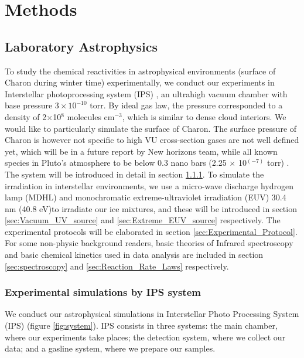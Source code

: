 \chapter{\protect Methods}
\label{methods}

\section{Laboratory Astrophysics}
To study the chemical reactivities in astrophysical environments (surface of Charon during winter time) experimentally,
we conduct our experiments in Interstellar photoprocessing system (IPS) \cite{chen2013vacuum},
an ultrahigh vacuum chamber with base pressure $3 \times 10^{-10}$ torr. By ideal gas law, the pressure corresponded to a density of 2$\times$10$^8$ molecules cm$^{-3}$, which is similar to dense cloud interiors. We would like to particularly simulate the surface of Charon. The surface pressure of Charon is however not specific to high VU cross-section gases are not well defined yet, which will be in a future report by New horizons team, while all known species in Pluto's atmosphere to be below 0.3 nano bars (2.25 $\times$ 10$^(-7)$ torr) \cite{stern2017new}.
The system will be introduced in detail in section \ref{sec:IPS_system}.
To simulate the irradiation in interstellar environments,
we use a micro-wave discharge hydrogen lamp (MDHL) and monochromatic extreme-ultraviolet irradiation (EUV) 30.4 nm (40.8 eV)to irradiate our ice mixtures,
and these will be introduced in section \ref{sec:Vacuum_UV_source} and \ref{sec:Extreme_EUV_source} respectively.
The experimental protocols will be elaborated in section \ref{sec:Experimental_Protocol}.
For some non-physic background readers, basic theories of Infrared spectroscopy and basic chemical kinetics used in data analysis are included in section \ref{sec:spectroscopy} and \ref{sec:Reaction_Rate_Laws} respectively.\\

\subsection{Experimental simulations by IPS system}
\label{sec:IPS_system}

We conduct our astrophysical simulations in Interstellar Photo Processing System (IPS) (figure \ref{fig:system}). IPS consists in three systems: the main chamber, where our experiments take places; the detection system, where we collect our data; and a gasline system, where we prepare our samples.

